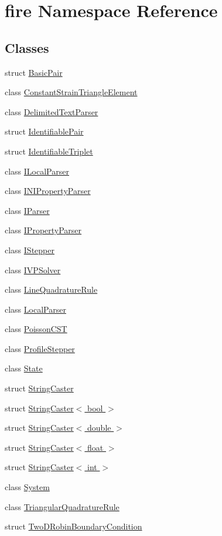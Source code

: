 \hypertarget{a00195}{}\section{fire Namespace Reference}
\label{a00195}
\subsection*{Classes}
\begin{DoxyCompactItemize}
\item 
struct \hyperlink{a00774}{Basic\+Pair}
\item 
class \hyperlink{a00770}{Constant\+Strain\+Triangle\+Element}
\item 
class \hyperlink{a00806}{Delimited\+Text\+Parser}
\item 
struct \hyperlink{a00778}{Identifiable\+Pair}
\item 
struct \hyperlink{a00782}{Identifiable\+Triplet}
\item 
class \hyperlink{a00810}{I\+Local\+Parser}
\item 
class \hyperlink{a00814}{I\+N\+I\+Property\+Parser}
\item 
class \hyperlink{a00818}{I\+Parser}
\item 
class \hyperlink{a00822}{I\+Property\+Parser}
\item 
class \hyperlink{a00794}{I\+Stepper}
\item 
class \hyperlink{a00870}{I\+V\+P\+Solver}
\item 
class \hyperlink{a00862}{Line\+Quadrature\+Rule}
\item 
class \hyperlink{a00826}{Local\+Parser}
\item 
class \hyperlink{a00790}{Poisson\+C\+ST}
\item 
class \hyperlink{a00798}{Profile\+Stepper}
\item 
class \hyperlink{a00874}{State}
\item 
struct \hyperlink{a00830}{String\+Caster}
\item 
struct \hyperlink{a00846}{String\+Caster$<$ bool $>$}
\item 
struct \hyperlink{a00834}{String\+Caster$<$ double $>$}
\item 
struct \hyperlink{a00838}{String\+Caster$<$ float $>$}
\item 
struct \hyperlink{a00842}{String\+Caster$<$ int $>$}
\item 
class \hyperlink{a00802}{System}
\item 
class \hyperlink{a00866}{Triangular\+Quadrature\+Rule}
\item 
struct \hyperlink{a00786}{Two\+D\+Robin\+Boundary\+Condition}
\end{DoxyCompactItemize}
